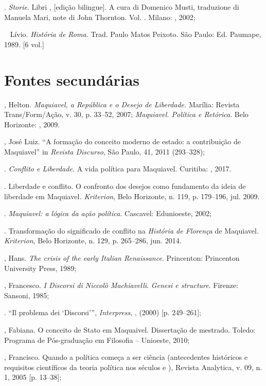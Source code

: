 \begin{bibliohedra}
. \emph{Storie}. Libri , {[}edição bilingue{]}. A cura di
Domenico Musti, traduzione di Manuela Mari, note di John Thornton. Vol.
. Milano: , 2002;

\mbox{ } Lívio. \emph{História de Roma.} Trad. Paulo Matos Peixoto. São
Paulo: Ed. Paumape, 1989. {[}6 vol.{]}

\section*{Fontes secundárias}

, Helton. \emph{Maquiavel, a República e o Desejo de Liberdade.}
Marília: Revista Trans/Form/Ação, v. 30, p. 33--52, 2007;
\emph{Maquiavel. Política e Retórica}. Belo Horizonte: , 2009.

, José Luiz. ``A formação do conceito moderno de estado: a
contribuição de Maquiavel'' in \emph{Revista Discurso}, São Paulo, 41,
2011 (293--328);

\titidem. \emph{Conflito e Liberdade.} A vida política para
Maquiavel. Curitiba: , 2017.

\titidem. Liberdade e conflito. O confronto dos desejos como
fundamento da ideia de liberdade em Maquiavel\emph{. Kriterion}, Belo
Horizonte, n. 119, p. 179--196, jul. 2009.

\titidem. \emph{Maquiavel: a lógica da ação política.} Cascavel:
Edunioeste, 2002;

\titidem. Transformação do significado de conflito na
\emph{História de Florença} de Maquiavel\emph{. Kriterion}, Belo
Horizonte, n. 129, p. 265--286, jun. 2014.

, Hans. \emph{The crisis of the early Italian Renaissance}.
Princenton: Princenton University Press, 1989;

, Francesco. \emph{I Discorsi di Niccolò Machiavelli}. \emph{Genesi
e structure}. Firenze: Sansoni, 1985;

\titidem. ``Il problema dei `Discorsi''', \emph{Interpress},
, (2000) {[}p. 249--261{]};

, Fabiana. O conceito de Stato em Maquaivel. Dissertação de
mestrado. Toledo: Programa de Pós-graduação em Filosofia -- Unioeste,
2010;

, Francisco. Quando a política começa a ser ciência
(antecedentes históricos e requisitos científicos da teoria política nos
séculos  e ), Revista Analytica, v. 09, n. 1, 2005 {[}p.
13--38{]};


\end{bibliohedra}

